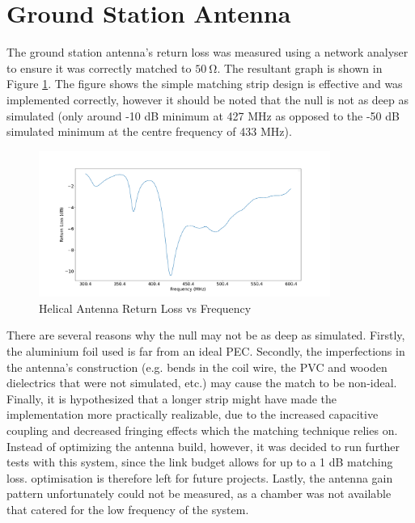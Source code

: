 \graphicspath{{./figures}}

\section{Ground Station Antenna}

The ground station antenna's return loss was measured using a network analyser to ensure it was correctly matched to $\SI{50}{\ohm}$. The resultant graph is shown in Figure \ref{fig:helicalReturnLoss}. The figure shows the simple matching strip design is effective and was implemented correctly, however it should be noted that the null is not as deep as simulated (only around -10 dB minimum at 427 MHz as opposed to the -50 dB simulated minimum at the centre frequency of 433 MHz).

\begin{figure}[!htb]
  \centering
  \includegraphics[width=0.85\textwidth]{helicalReturnLoss}
  \caption{Helical Antenna Return Loss vs Frequency}
  \label{fig:helicalReturnLoss}
\end{figure}

There are several reasons why the null may not be as deep as simulated. Firstly, the aluminium foil used is far from an ideal PEC. Secondly, the imperfections in the antenna's construction (e.g. bends in the coil wire, the PVC and wooden dielectrics that were not simulated, etc.) may cause the match to be non-ideal. Finally, it is hypothesized that a longer strip might have made the implementation more practically realizable, due to the increased capacitive coupling and decreased fringing effects which the matching technique relies on. Instead of optimizing the antenna build, however, it was decided to run further tests with this system, since the link budget allows for up to a 1 dB matching loss. optimisation is therefore left for future projects. Lastly, the antenna gain pattern unfortunately could not be measured, as a chamber was not available that catered for the low frequency of the system.
